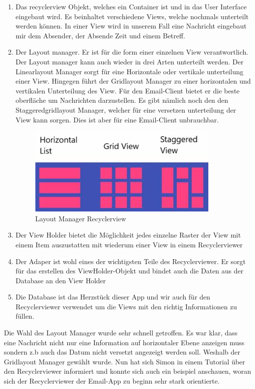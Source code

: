 \documentclass[a4paper,11pt]{article}
\begin{document}
\begin{enumerate}


    \item Das recyclerview Objekt, welches ein Container ist und in das User Interface eingebaut wird. 
Es beinhaltet verschiedene Views, welche nochmals unterteilt werden können. In einer View wird in unserem 
Fall eine Nachricht eingebaut mir dem Absender, der Absende Zeit und einem Betreff. 

    \item Der Layout manager. Er ist für die form einer einzelnen View verantwortlich. 
Der Layout manager kann auch wieder in drei Arten unterteilt werden. Der Linearlayout Manager sorgt für eine 
Horizontale oder vertikale unterteilung einer View. Hingegen führt der Gridlayout Manager zu einer horizontalen 
und vertikalen Unterteilung des View. Für den Email-Client bietet er die  
beste oberfläche um Nachrichten darzustellen. Es gibt nämlich noch den den Staggeredgridlayout Manager, welcher 
für eine versetzen unterteilung der View kann sorgen. Dies ist aber für eine Email-Client unbrauchbar. 

\begin{figure}[H]
    \centering
    \includegraphics[width=.4\textwidth]{media/RecyclerviewLayoutManagerCropt.jpeg}
    \caption{Layout Manager Recyclerview}
\end{figure}

    \item Der View Holder bietet die Möglichkeit jedes einzelne Raster der View mit einem Item auszustatten mit wiederum einer View in einem Recyclerviewer

    \item Der Adaper ist wohl eines der wichtigsten Teile des Recyclerviewer. Er sorgt für das erstellen des ViewHolder-Objekt und
bindet auch die Daten aus der Database an den View Holder

    \item Die Database ist das Herzstück dieser App und wir auch für den Recyclerviewer verwendet um die 
Views mit den richtig Informationen zu füllen. 

\end{enumerate}

Die Wahl des Layout Manager wurde sehr schnell getroffen. Es war klar, dass eine Nachricht nicht nur eine Information auf horizontaler Ebene anzeigen muss sondern
z.b auch das Datum nicht versetzt angezeigt werden soll. Weshalb der Gridlayout Manager gewählt wurde. Nun hat sich Simon in einem Tutorial über den Recyclerviewer informiert
und konnte sich auch ein beispiel anschauen, woran sich der Recyclerviewer der Email-App zu beginn sehr stark orientierte. \\
\end{document}
